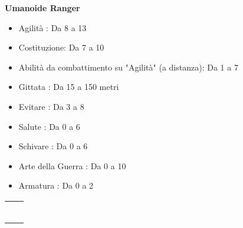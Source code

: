 \documentclass[../manuale_main.tex]{subfiles}
\begin{document}
\textbf{Umanoide Ranger}
\begin{itemize}
\item Agilità : Da 8 a 13
\item Costituzione: Da 7 a 10
\item Abilità da combattimento su "Agilità" (a distanza): Da 1 a 7
\item Gittata : Da 15 a 150 metri
\item Evitare : Da 3 a 8
\item Salute : Da 0 a 6
\item Schivare : Da 0 a 6
\item Arte della Guerra : Da 0 a 10
\item Armatura : Da 0 a 2
\end{itemize}


\begin{tabularx}{\textwidth}{|l|c|}
\hline
\multicolumn{2}{|c|}{} \\
\multicolumn{2}{|X|}{} \\
\hline
          &          \\
          &          \\
          &          \\
          &          \\
\hline
\end{tabularx}
\end{document}

